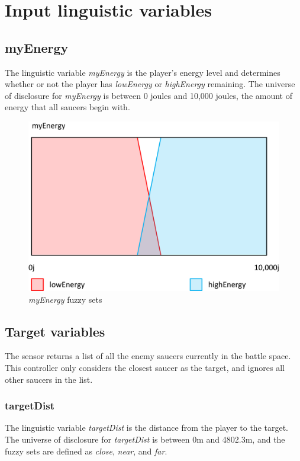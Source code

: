 \section{Input linguistic variables}

\subsection{myEnergy}

The linguistic variable \emph{myEnergy} is the player's energy level and determines whether or not the player has \emph{lowEnergy} or \emph{highEnergy} remaining. The universe of disclosure for \emph{myEnergy} is between 0 joules and 10,000 joules, the amount of energy that all saucers begin with.

\begin{figure}[H]
\centering
\caption{\emph{myEnergy} fuzzy sets}
\includegraphics[scale=0.08]{./img/pdf/myEnergySets.pdf}
\end{figure}

\subsection{Target variables}

The sensor returns a list of all the enemy saucers currently in the battle space. This controller only considers the closest saucer as the target, and ignores all other saucers in the list.

\subsubsection{targetDist}

The linguistic variable \emph{targetDist} is the distance from the player to the target. The universe of disclosure for \emph{targetDist} is between 0m and 4802.3m, and the fuzzy sets are defined as \emph{close}, \emph{near}, and \emph{far}.

